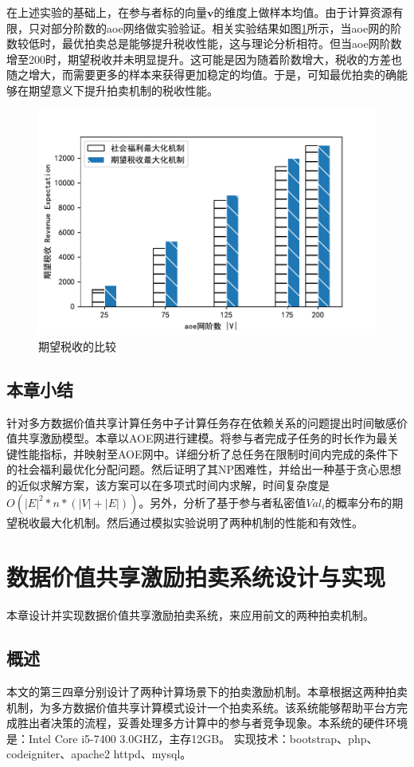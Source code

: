 \documentclass[promaster]{thesis-uestc}
\begin{document}
在上述实验的基础上，在参与者标的向量$\mathbf{v}$的维度上做样本均值。由于计算资源有限，只对部分阶数的aoe网络做实验验证。相关实验结果如图\ref{picc2}所示，当aoe网的阶数较低时，最优拍卖总是能够提升税收性能，这与理论分析相符。但当aoe网阶数增至200时，期望税收并未明显提升。这可能是因为随着阶数增大，税收的方差也随之增大，而需要更多的样本来获得更加稳定的均值。于是，可知最优拍卖的确能够在期望意义下提升拍卖机制的税收性能。

\begin{figure}[H]
    \includegraphics[width=325pt]{exp/expswandoptimal.pdf}
    \caption{期望税收的比较}
    \label{picc2}
\end{figure}

\FloatBarrier

\section{本章小结}

针对多方数据价值共享计算任务中子计算任务存在依赖关系的问题提出时间敏感价值共享激励模型。本章以AOE网进行建模。将参与者完成子任务的时长作为最关键性能指标，并映射至AOE网中。详细分析了总任务在限制时间内完成的条件下的社会福利最优化分配问题。然后证明了其NP困难性，并给出一种基于贪心思想的近似求解方案，该方案可以在多项式时间内求解，时间复杂度是$O(|E|^2*n*(|V|+|E|))$。另外，分析了基于参与者私密值$Val_i$的概率分布的期望税收最大化机制。然后通过模拟实验说明了两种机制的性能和有效性。


\chapter{数据价值共享激励拍卖系统设计与实现}
本章设计并实现数据价值共享激励拍卖系统，来应用前文的两种拍卖机制。
\section{概述}
本文的第三四章分别设计了两种计算场景下的拍卖激励机制。本章根据这两种拍卖机制，为多方数据价值共享计算模式设计一个拍卖系统。该系统能够帮助平台方完成胜出者决策的流程，妥善处理多方计算中的参与者竞争现象。本系统的硬件环境是：Intel Core i5-7400 3.0GHZ，主存12GB。
实现技术：bootstrap、php、codeigniter、apache2 httpd、mysql。
\end{document}
